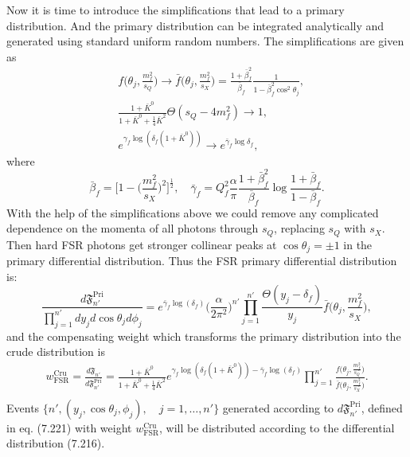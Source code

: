 Now it is time to introduce the simplifications that lead to a primary distribution. And the primary distribution can be integrated analytically and generated using standard uniform random numbers. The simplifications are given as
\begin{align}
&f\biggl(\theta_j,\frac{m_f^2}{s_Q}\biggr)\to \bar{f}\biggl(\theta_j,\frac{m_f^2}{s_X}\biggr)=\frac{1+\bar{\beta}^2_f}{\bar{\beta}_f}\frac{1}{1-\bar{\beta}_f^2\cos^2\theta_j},\nonumber\\
&\frac{1+\bar{K}^0}{1+\bar{K}^0+\frac{1}{4}\bar{K}^2}\Theta(s_Q-4m^2_f)\to 1,\nonumber\\
&e^{\gamma_f\log(\delta_f(1+\bar{K}^0))}\to e^{\bar{\gamma}_f\log{\delta}_f},
\end{align}
where
\begin{equation}
\bar{\beta}_f=\biggl[1-\biggl(\frac{m^2_f}{s_X}\biggr)^2\biggr]^\frac{1}{2},\quad \bar{\gamma}_f=Q^2_f\frac{\alpha}{\pi}\frac{1+\bar{\beta}^2_f}{\bar{\beta}_f}\log\frac{1+\bar{\beta}_f}{1-\bar{\beta}_f}.
\end{equation}
With the help of the simplifications above we could remove any complicated dependence on the momenta of all photons through $s_Q$, replacing $s_Q$ with $s_X$. Then hard FSR photons get stronger collinear peaks at $\cos\theta_j=\pm 1$ in the primary differential distribution. Thus the FSR primary differential distribution is:
\begin{equation}
\frac{d\mathfrak{F}^\text{Pri}_{n'}}{\prod_{j=1}^{n'}dy_jd\cos\theta_j d\phi_j}=e^{\bar{\gamma}_f\log(\delta_f)}\biggl(\frac{\alpha}{2\pi^2}\biggr)^{n'}\prod_{j=1}^{n'}\frac{\Theta(y_j-\delta_f)}{y_j}\bar{f}\biggl(\theta_j,\frac{m^2_f}{s_X}\biggr),
\end{equation}
and the compensating weight which transforms the primary distribution into the crude distribution is
\begin{eqnarray}
w^\text{Cru}_\text{FSR}=\frac{d\mathfrak{F}_{n'}}{d\mathfrak{F}_{n'}^\text{Pri}}=\frac{1+\bar{K}^0}{1+\bar{K}^0+\frac{1}{4}\bar{K}^2}e^{\gamma_f\log(\delta_f(1+\bar{K}^0))-\bar{\gamma}_f\log(\delta_f)}\prod_{j=1}^{n'}\frac{f\biggl(\theta_j,\frac{m^2_f}{s_Q}\biggr)}{\bar{f}\biggl(\theta_j,\frac{m^2_f}{s_X}\biggr)}.\nonumber\\
\end{eqnarray}
Events $\{n',(y_j,\cos\theta_j,\phi_j),\quad j=1,\ldots,n'\}$ generated according to $d\mathfrak{F}^\text{Pri}_{n'}$, defined in eq. (7.221) with weight $w^\text{Cru}_\text{FSR}$, will be distributed according to the differential distribution (7.216).

